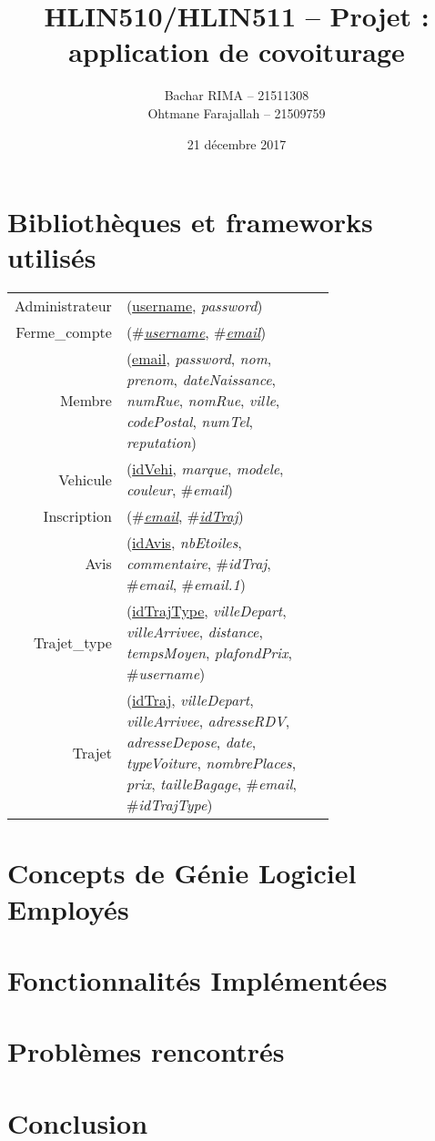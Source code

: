 \documentclass[a4paper,12pt]{article}
\title{HLIN510/HLIN511 -- Projet : \textbf{application de covoiturage}}
\author{Bachar RIMA -- 21511308\\ Ohtmane Farajallah -- 21509759}
\date{21 décembre 2017}
\newenvironment{mld}
  {\par\begin{minipage}{\linewidth}\begin{tabular}{rp{0.7\linewidth}}}
  {\end{tabular}\end{minipage}\par}
\newcommand{\attr}[1]{\emph{#1}}
\newcommand{\prim}[1]{\uline{#1}}
\newcommand{\foreign}[1]{\#\textsl{#1}}
\theoremstyle{remark}
\begin{document}
\pagestyle{plain}

\maketitle
{
  \hypersetup{linkcolor=black}
  \tableofcontents
}

\newpage

\section*{Bibliothèques et frameworks utilisés}
\label{sec:bib_framework}

\begin{mld}
  Administrateur & (\prim{username}, \attr{password})\\
  Ferme\_compte & (\foreign{\prim{username}}, \foreign{\prim{email}})\\
  Membre & (\prim{email}, \attr{password}, \attr{nom}, \attr{prenom}, \attr{dateNaissance}, \attr{numRue}, \attr{nomRue}, \attr{ville}, \attr{codePostal}, \attr{numTel}, \attr{reputation})\\
  Vehicule & (\prim{idVehi}, \attr{marque}, \attr{modele}, \attr{couleur}, \foreign{email})\\
  Inscription & (\foreign{\prim{email}}, \foreign{\prim{idTraj}})\\
  Avis & (\prim{idAvis}, \attr{nbEtoiles}, \attr{commentaire}, \foreign{idTraj}, \foreign{email}, \foreign{email.1})\\
  Trajet\_type & (\prim{idTrajType}, \attr{villeDepart}, \attr{villeArrivee}, \attr{distance}, \attr{tempsMoyen}, \attr{plafondPrix}, \foreign{username})\\
  Trajet & (\prim{idTraj}, \attr{villeDepart}, \attr{villeArrivee}, \attr{adresseRDV}, \attr{adresseDepose}, \attr{date}, \attr{typeVoiture}, \attr{nombrePlaces}, \attr{prix}, \attr{tailleBagage}, \foreign{email}, \foreign{idTrajType})\\
\end{mld}

\section*{Concepts de Génie Logiciel Employés}
\label{sec:genie_logiciel}

\section*{Fonctionnalités Implémentées}
\label{sec:fonc_impl}

\section*{Problèmes rencontrés}
\label{sec:prob_rencont}

\section*{Conclusion}
\label{sec:conclusion}
\end{document}
